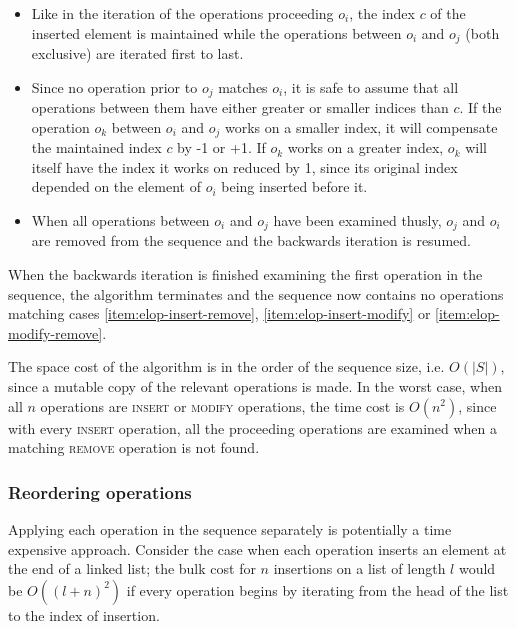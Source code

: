 \begin{itemize}

  \item Like in the iteration of the operations proceeding $o_i$, the index $c$
  of the inserted element is maintained while the operations between $o_i$ and
  $o_j$ (both exclusive) are iterated first to last.

  \item Since no operation prior to $o_j$ matches $o_i$, it is safe to assume
  that all operations between them have either greater or smaller indices than
  $c$. If the operation $o_k$ between $o_i$ and $o_j$ works on a smaller index,
  it will compensate the maintained index $c$ by -1 or +1. If $o_k$ works on a
  greater index, $o_k$ will itself have the index it works on reduced by 1,
  since its original index depended on the element of $o_i$ being inserted
  before it.

  \item When all operations between $o_i$ and $o_j$ have been examined thusly,
  $o_j$ and $o_i$ are removed from the sequence and the backwards iteration is
  resumed.

\end{itemize}

When the backwards iteration is finished examining the first operation in the
sequence, the algorithm terminates and the sequence now contains no operations
matching cases \ref{item:elop-insert-remove}, \ref{item:elop-insert-modify} or
\ref{item:elop-modify-remove}.

The space cost of the algorithm is in the order of the sequence size, i.e.
$O(\left|S\right|)$, since a mutable copy of the relevant operations is made.
In the worst case, when all $n$ operations are \textsc{insert} or
\textsc{modify} operations, the time cost is $O\left(n^2\right)$, since with
every \textsc{insert} operation, all the proceeding operations are examined when
a matching \textsc{remove} operation is not found.

\subsubsection{Reordering operations}

Applying each operation in the sequence separately is potentially a time
expensive approach. Consider the case when each operation inserts an element at
the end of a linked list; the bulk cost for $n$ insertions on a list of length
$l$ would be $O\left(\left(l+n\right)^2\right)$ if every operation begins by
iterating from the head of the list to the index of insertion.

